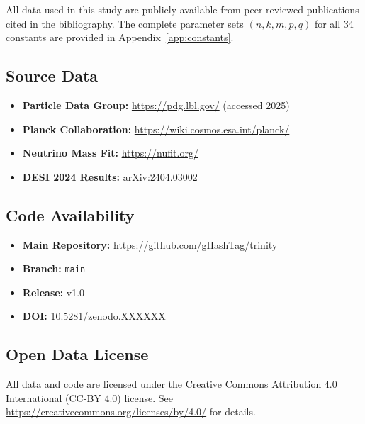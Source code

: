 \documentclass[aps,prd,preprint,superscriptaddress,showpacs,nofootinbib,longbibliography]{revtex4-2}
\begin{document}
All data used in this study are publicly available from peer-reviewed publications cited in the bibliography. The complete parameter sets $(n,k,m,p,q)$ for all 34 constants are provided in Appendix~\ref{app:constants}.

\subsection{Source Data}

\begin{itemize}
    \item \textbf{Particle Data Group:} \url{https://pdg.lbl.gov/} (accessed 2025)
    \item \textbf{Planck Collaboration:} \url{https://wiki.cosmos.esa.int/planck/}
    \item \textbf{Neutrino Mass Fit:} \url{https://nufit.org/}
    \item \textbf{DESI 2024 Results:} arXiv:2404.03002
\end{itemize}

\subsection{Code Availability}

\begin{itemize}
    \item \textbf{Main Repository:} \url{https://github.com/gHashTag/trinity}
    \item \textbf{Branch:} \texttt{main}
    \item \textbf{Release:} v1.0
    \item \textbf{DOI:} 10.5281/zenodo.XXXXXX
\end{itemize}

\subsection{Open Data License}

All data and code are licensed under the Creative Commons Attribution 4.0 International (CC-BY 4.0) license. See \url{https://creativecommons.org/licenses/by/4.0/} for details.
\end{document}
